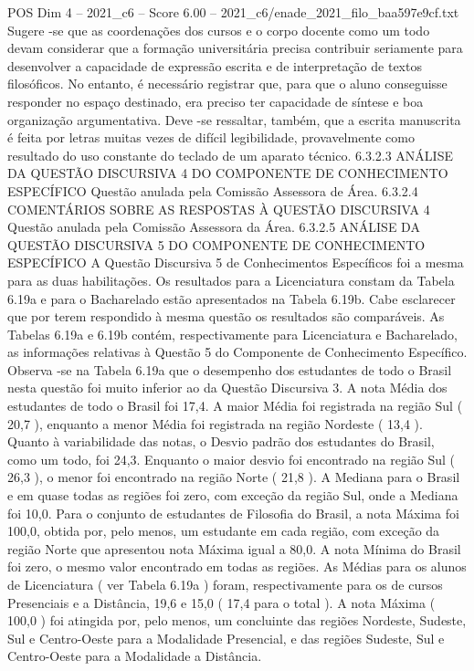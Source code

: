 \begin{textsample}{POS Dim 4 – 2021\_c6 – Score 6.00 – 2021\_c6/enade\_2021\_filo\_baa597e9cf.txt}
Sugere -se que as coordenações dos cursos e o corpo docente como um todo devam considerar que a formação universitária precisa contribuir seriamente para desenvolver a capacidade de expressão escrita e de interpretação de textos filosóficos.
No entanto, é necessário registrar que, para que o aluno conseguisse responder no espaço destinado, era preciso ter capacidade de síntese e boa organização argumentativa.
Deve -se ressaltar, também, que a escrita manuscrita é feita por letras muitas vezes de difícil legibilidade, provavelmente como resultado do uso constante do teclado de um aparato técnico. 6.3.2.3 ANÁLISE DA QUESTÃO DISCURSIVA 4 DO COMPONENTE DE CONHECIMENTO ESPECÍFICO Questão anulada pela Comissão Assessora de Área. 6.3.2.4 COMENTÁRIOS SOBRE AS RESPOSTAS À QUESTÃO DISCURSIVA 4 Questão anulada pela Comissão Assessora da Área. 6.3.2.5 ANÁLISE DA QUESTÃO DISCURSIVA 5 DO COMPONENTE DE CONHECIMENTO ESPECÍFICO A Questão Discursiva 5 de Conhecimentos Específicos foi a mesma para as duas habilitações.
Os resultados para a Licenciatura constam da Tabela 6.19a e para o Bacharelado estão apresentados na Tabela 6.19b.
Cabe esclarecer que por terem respondido à mesma questão os resultados são comparáveis.
As Tabelas 6.19a e 6.19b contém, respectivamente para Licenciatura e Bacharelado, as informações relativas à Questão 5 do Componente de Conhecimento Específico.
Observa -se na Tabela 6.19a que o desempenho dos estudantes de todo o Brasil nesta questão foi muito inferior ao da Questão Discursiva 3.
A nota Média dos estudantes de todo o Brasil foi 17,4.
A maior Média foi registrada na região Sul ( 20,7 ), enquanto a menor Média foi registrada na região Nordeste ( 13,4 ).
Quanto à variabilidade das notas, o Desvio padrão dos estudantes do Brasil, como um todo, foi 24,3.
Enquanto o maior desvio foi encontrado na região Sul ( 26,3 ), o menor foi encontrado na região Norte ( 21,8 ).
A Mediana para o Brasil e em quase todas as regiões foi zero, com exceção da região Sul, onde a Mediana foi 10,0.
Para o conjunto de estudantes de Filosofia do Brasil, a nota Máxima foi 100,0, obtida por, pelo menos, um estudante em cada região, com exceção da região Norte que apresentou nota Máxima igual a 80,0.
A nota Mínima do Brasil foi zero, o mesmo valor encontrado em todas as regiões.
As Médias para os alunos de Licenciatura ( ver Tabela 6.19a ) foram, respectivamente para os de cursos Presenciais e a Distância, 19,6 e 15,0 ( 17,4 para o total ).
A nota Máxima ( 100,0 ) foi atingida por, pelo menos, um concluinte das regiões Nordeste, Sudeste, Sul e Centro-Oeste para a Modalidade Presencial, e das regiões Sudeste, Sul e Centro-Oeste para a Modalidade a Distância.

\end{textsample}

